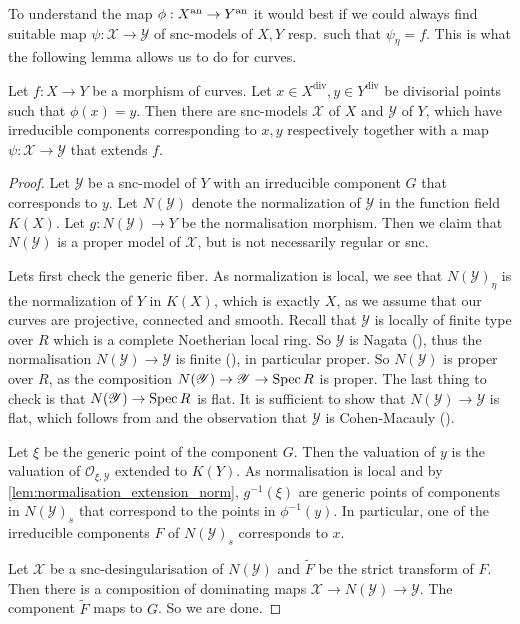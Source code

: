 To understand the map $\phi: X\an \to Y\an$ it would best if we could always find suitable map $\psi: \mathscr X \to \mathscr Y$ of snc-models of $X, Y$ resp.\ such that $\psi_\eta = f$. This is what the following lemma allows us to do for curves. 
\begin{lemma}\label{lem:snc_models_morphism_curves}
	Let $f: X \to Y$ be a morphism of curves. 
	Let $x \in X^{\text{div}}, y \in Y^{\text{div}}$ be divisorial points such that $\phi(x) = y$. 
	Then there are snc-models $\mathscr X$ of $X$ and $\mathscr Y$ of $Y$, which have irreducible components corresponding to $x, y$ respectively together with a map $\psi: \mathscr X \to \mathscr Y$ that extends $f$. 
\end{lemma} 
\begin{proof}
	Let $\mathscr Y$ be a snc-model of $Y$ with an irreducible component $G$ that corresponds to $y$. 
	Let $N(\mathscr Y)$ denote the normalization of $\mathscr Y$ in the function field $K(X)$. 
	Let $g: N(\mathscr Y) \to Y$ be the normalisation morphism. 
	Then we claim that $N(\mathscr Y)$ is a proper model of $\mathscr X$, but is not necessarily regular or snc. 
	
	Lets first check the generic fiber.
	As normalization is local, we see that  $N(\mathscr Y)_\eta$ is the normalization of $Y$ in $K(X)$, which is exactly $X$, as we assume that our curves are projective, connected and smooth. 
	Recall that $\mathscr Y$ is locally of finite type over $R$ which is a complete Noetherian local ring. 
	So $\mathscr Y$ is Nagata (), thus the normalisation $N(\mathscr Y) \to \mathscr Y$  is finite (), in particular proper. 
	So $N(\mathscr Y)$ is proper over $R$, as the composition $N(\mathscr Y) \to \mathscr Y \to \operatorname{Spec} R$ is proper. 
	The last thing to check is that $N(\mathscr Y) \to \operatorname{Spec} R$ is flat. It is sufficient to show that $N(\mathscr Y) \to \mathscr Y$ is flat, 
	which follows from \cite[thm.\ 18.H]{matsumuraCommutativeAlgebra1980} and the observation that $\mathscr Y$ is Cohen-Macauly (\cite[cor.\ 8.2.22]{liuAlgebraicGeometryArithmetic2002}).
	
	Let $\xi$ be the generic point of the component $G$. 
	Then the valuation of $y$ is the valuation of $\mathcal{O}_{\xi, \mathscr Y}$ extended to $K\left( Y \right) $. 
	As normalisation is local and by \cref{lem:normalisation_extension_norm}, $g^{-1}(\xi)$ are generic points of components in $N(\mathscr Y)_s$ that correspond to the points in $\phi^{-1}(y)$. 
	In particular, one of the irreducible components $F$ of $N(\mathscr Y)_s$ corresponds to $x$. 

	Let $\mathscr X$ be a snc-desingularisation of $N(\mathscr Y)$ and $\tilde F$ be the strict transform of $F$. 
	Then there is a composition of dominating maps $\mathscr X \to  N(\mathscr Y) \to \mathscr Y$.
	The component $\tilde F$ maps to $G$. So we are done. 
\end{proof}

